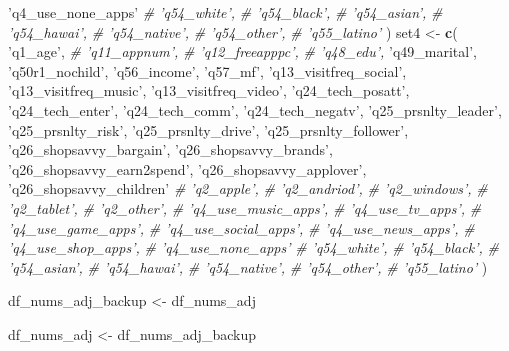 \documentclass[]{article}
\newenvironment{Shaded}{\begin{snugshade}}{\end{snugshade}}
\newcommand{\KeywordTok}[1]{\textcolor[rgb]{0.13,0.29,0.53}{\textbf{#1}}}
\newcommand{\StringTok}[1]{\textcolor[rgb]{0.31,0.60,0.02}{#1}}
\newcommand{\CommentTok}[1]{\textcolor[rgb]{0.56,0.35,0.01}{\textit{#1}}}
\newcommand{\NormalTok}[1]{#1}
\begin{document}
\begin{Shaded}
\begin{Highlighting}[]
  \StringTok{'q4_use_none_apps'}
  \CommentTok{# 'q54_white',}
  \CommentTok{# 'q54_black',}
  \CommentTok{# 'q54_asian',}
  \CommentTok{# 'q54_hawai',}
  \CommentTok{# 'q54_native',}
  \CommentTok{# 'q54_other',}
  \CommentTok{# 'q55_latino'}
\NormalTok{  )}
\NormalTok{set4 <-}\StringTok{ }\KeywordTok{c}\NormalTok{(}
  \StringTok{'q1_age'}\NormalTok{,}
  \CommentTok{# 'q11_appnum',}
  \CommentTok{# 'q12_freeapppc',}
  \CommentTok{# 'q48_edu',}
  \StringTok{'q49_marital'}\NormalTok{,}
  \StringTok{'q50r1_nochild'}\NormalTok{,}
  \StringTok{'q56_income'}\NormalTok{,}
  \StringTok{'q57_mf'}\NormalTok{,}
  \StringTok{'q13_visitfreq_social'}\NormalTok{,}
  \StringTok{'q13_visitfreq_music'}\NormalTok{,}
  \StringTok{'q13_visitfreq_video'}\NormalTok{,}
  \StringTok{'q24_tech_posatt'}\NormalTok{,}
  \StringTok{'q24_tech_enter'}\NormalTok{,}
  \StringTok{'q24_tech_comm'}\NormalTok{,}
  \StringTok{'q24_tech_negatv'}\NormalTok{,}
  \StringTok{'q25_prsnlty_leader'}\NormalTok{,}
  \StringTok{'q25_prsnlty_risk'}\NormalTok{,}
  \StringTok{'q25_prsnlty_drive'}\NormalTok{,}
  \StringTok{'q25_prsnlty_follower'}\NormalTok{,}
  \StringTok{'q26_shopsavvy_bargain'}\NormalTok{,}
  \StringTok{'q26_shopsavvy_brands'}\NormalTok{,}
  \StringTok{'q26_shopsavvy_earn2spend'}\NormalTok{,}
  \StringTok{'q26_shopsavvy_applover'}\NormalTok{,}
  \StringTok{'q26_shopsavvy_children'}
  \CommentTok{# 'q2_apple',}
  \CommentTok{# 'q2_andriod',}
  \CommentTok{# 'q2_windows',}
  \CommentTok{# 'q2_tablet',}
  \CommentTok{# 'q2_other',}
  \CommentTok{# 'q4_use_music_apps',}
  \CommentTok{# 'q4_use_tv_apps',}
  \CommentTok{# 'q4_use_game_apps',}
  \CommentTok{# 'q4_use_social_apps',}
  \CommentTok{# 'q4_use_news_apps',}
  \CommentTok{# 'q4_use_shop_apps',}
  \CommentTok{# 'q4_use_none_apps'}
  \CommentTok{# 'q54_white',}
  \CommentTok{# 'q54_black',}
  \CommentTok{# 'q54_asian',}
  \CommentTok{# 'q54_hawai',}
  \CommentTok{# 'q54_native',}
  \CommentTok{# 'q54_other',}
  \CommentTok{# 'q55_latino'}
\NormalTok{  )}
\end{Highlighting}
\end{Shaded}

\begin{Shaded}
\begin{Highlighting}[]
\NormalTok{df_nums_adj_backup <-}\StringTok{ }\NormalTok{df_nums_adj}
\end{Highlighting}
\end{Shaded}

\begin{Shaded}
\begin{Highlighting}[]
\NormalTok{df_nums_adj <-}\StringTok{ }\NormalTok{df_nums_adj_backup}
\end{Highlighting}
\end{Shaded}
\end{document}
